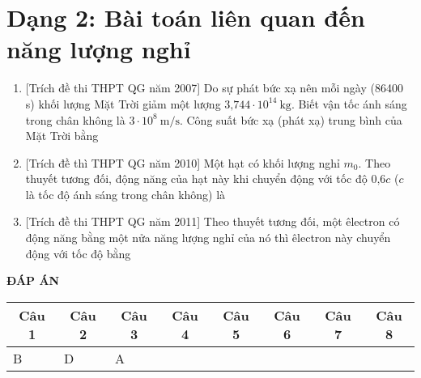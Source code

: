 \section{Dạng 2: Bài toán liên quan đến năng lượng nghỉ}
\begin{enumerate}
	\item {[Trích đề thi THPT QG năm 2007] Do sự phát bức xạ nên mỗi ngày (86400 s) khối lượng Mặt Trời giảm một lượng $\text{3,744}\cdot 10^{14}\ \text{kg}$. Biết vận tốc ánh sáng trong chân không là $3\cdot 10^8\ \text{m/s}$. Công suất bức xạ (phát xạ) trung bình của Mặt Trời bằng
	}
	\item{[Trích đề thì THPT QG năm 2010] Một hạt có khối lượng nghỉ $m_0$. Theo thuyết tương đối, động năng của hạt này khi chuyển động với tốc độ $\text{0,6}c$ ($c$ là tốc độ ánh sáng trong chân không) là
	}
	\item{[Trích đề thi THPT QG năm 2011] Theo thuyết tương đối, một êlectron có động năng bằng một nửa năng lượng nghỉ của nó thì êlectron này chuyển động với tốc độ bằng
	}
\end{enumerate}
\textbf{ĐÁP ÁN}
\begin{longtable}[\textwidth]{|p{}|p{}|p{}|p{}|p{}|p{}|p{}|p{}|}
	\hline%
	\multicolumn{1}{|c|}{\textbf{Câu 1}} & \multicolumn{1}{c|}{\textbf{Câu 2}} & \multicolumn{1}{c|}{\textbf{Câu 3}} &
	\multicolumn{1}{c|}{\textbf{Câu 4}} &
	\multicolumn{1}{c|}{\textbf{Câu 5}} &
	\multicolumn{1}{c|}{\textbf{Câu 6}} &
	\multicolumn{1}{c|}{\textbf{Câu 7}} &
	\multicolumn{1}{c|}{\textbf{Câu 8}} \\
	\hline
	B & D & A & && & &	\\
	\hline
\end{longtable}

